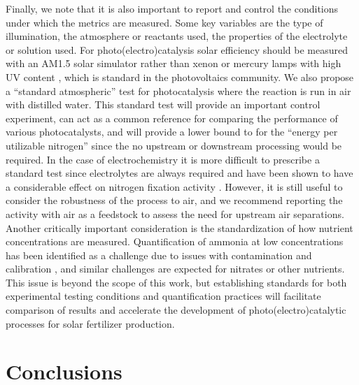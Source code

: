 Finally, we note that it is also important to report and control the conditions under which the metrics are measured. Some key variables are the type of illumination, the atmosphere or reactants used, the properties of the electrolyte or solution used. For photo(electro)catalysis solar efficiency should be measured with an AM1.5 solar simulator rather than xenon or mercury lamps with high UV content \cite{AM_1.5}, which is standard in the photovoltaics community. We also propose a ``standard atmospheric'' test for photocatalysis where the reaction is run in air with distilled water. This standard test will provide an important control experiment, can act as a common reference for comparing the performance of various photocatalysts, and will provide a lower bound to for the ``energy per utilizable nitrogen'' since the no upstream or downstream processing would be required. In the case of electrochemistry it is more difficult to prescribe a standard test since electrolytes are always required and have been shown to have a considerable effect on nitrogen fixation activity \cite{Song_2018,Zhou_2017,Sheets_2018,Cui_2018}. However, it is still useful to consider the robustness of the process to air, and we recommend reporting the activity with air as a feedstock to assess the need for upstream air separations. Another critically important consideration is the standardization of how nutrient concentrations are measured. Quantification of ammonia at low concentrations has been identified as a challenge due to issues with contamination and calibration \cite{Greenlee_2018,Gao_2018,Zhao_2019,Cui_2018,Suryanto_2019}, and similar challenges are expected for nitrates or other nutrients. This issue is beyond the scope of this work, but establishing standards for both experimental testing conditions and quantification practices will facilitate comparison of results and accelerate the development of photo(electro)catalytic processes for solar fertilizer production.

\section{Conclusions}

